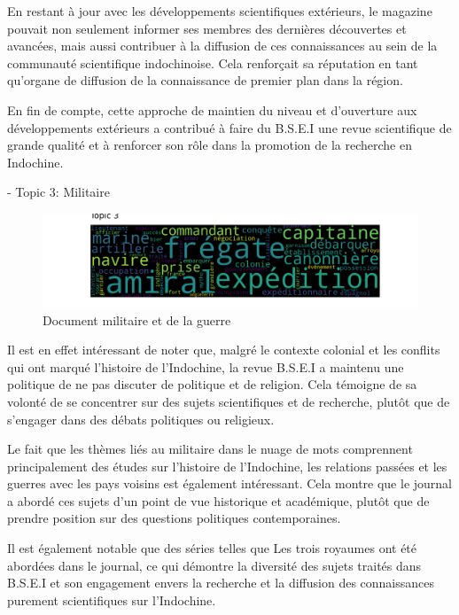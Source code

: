 En restant à jour avec les développements scientifiques extérieurs, le magazine pouvait non seulement informer ses membres des dernières découvertes et avancées, mais aussi contribuer à la diffusion de ces connaissances au sein de la communauté scientifique indochinoise. Cela renforçait sa réputation en tant qu'organe de diffusion de la connaissance de premier plan dans la région.

En fin de compte, cette approche de maintien du niveau et d'ouverture aux développements extérieurs a contribué à faire du B.S.E.I une revue scientifique de grande qualité et à renforcer son rôle dans la promotion de la recherche en Indochine.

- Topic 3: Militaire
\begin{figure}[H] %
    \centering
    \includegraphics[width=14cm]{img/final_6_topic 3 .png}
    \caption{Document militaire et de la guerre}
    \label{tp3}
\end{figure}

Il est en effet intéressant de noter que, malgré le contexte colonial et les conflits qui ont marqué l'histoire de l'Indochine, la revue B.S.E.I a maintenu une politique de ne pas discuter de politique et de religion. Cela témoigne de sa volonté de se concentrer sur des sujets scientifiques et de recherche, plutôt que de s'engager dans des débats politiques ou religieux.

Le fait que les thèmes liés au militaire dans le nuage de mots comprennent principalement des études sur l'histoire de l'Indochine, les relations passées et les guerres avec les pays voisins est également intéressant. Cela montre que le journal a abordé ces sujets d'un point de vue historique et académique, plutôt que de prendre position sur des questions politiques contemporaines.

Il est également notable que des séries telles que Les trois royaumes ont été abordées dans le journal, ce qui démontre la diversité des sujets traités dans B.S.E.I et son engagement envers la recherche et la diffusion des connaissances purement scientifiques sur l'Indochine.

